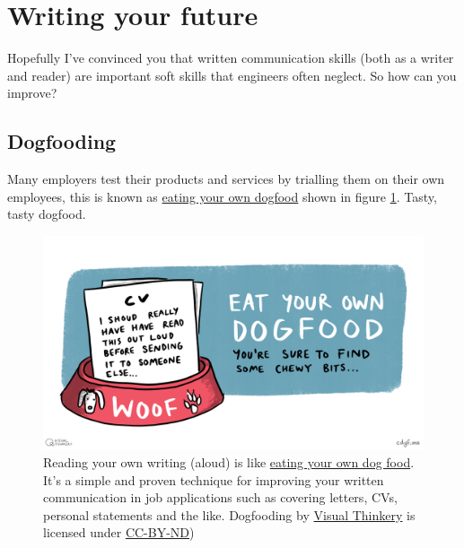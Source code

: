 \documentclass[
]{book}
\begin{document}
\hypertarget{wyf}{%
\section{Writing your future}\label{wyf}}

Hopefully I've convinced you that written communication skills (both as a writer and reader) are important soft skills that engineers often neglect. So how can you improve?

\hypertarget{dogfooding}{%
\subsection{Dogfooding}\label{dogfooding}}

Many employers test their products and services by trialling them on their own employees, this is known as \href{https://en.wikipedia.org/wiki/Eating_your_own_dog_food}{eating your own dogfood} shown in figure \ref{fig:dogfooding-fig}. Tasty, tasty dogfood. 🐶

\begin{figure}

{\centering \includegraphics[width=1\linewidth]{images/Dogfooding} 

}

\caption{Reading your own writing (aloud) is like \href{https://en.wikipedia.org/wiki/Eating_your_own_dog_food}{eating your own dog food}. It's a simple and proven technique for improving your written communication in job applications such as covering letters, CVs, personal statements and the like. Dogfooding by \href{https://visualthinkery.com/}{Visual Thinkery} is licensed under \href{https://creativecommons.org/licenses/by-nd/4.0/}{CC-BY-ND})}\label{fig:dogfooding-fig}
\end{figure}
\end{document}
